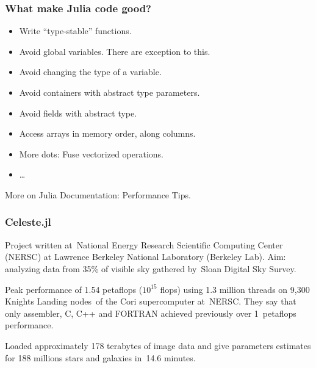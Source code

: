 \documentclass[10pt,t]{beamer}
\begin{document}
\begin{frame}
  \frametitle{What make Julia code good?}


  \begin{itemize}
    \RaggedRight

  \item Write ``\alert{type-stable}'' functions.

  \item Avoid global variables. There are exception to this.

  \item Avoid changing the type of a variable.

  \item Avoid containers with abstract type parameters.

  \item Avoid fields with abstract type.

  \item Access arrays in memory order, along columns.

  \item More dots: Fuse vectorized operations.

  \item \ldots

  \end{itemize}


  More on
  {Julia Documentation: Performance Tips}.

\end{frame}





\begin{frame}
  \frametitle{Celeste.jl}


  Project written at~National Energy Research Scientific Computing
  Center (NERSC) at Lawrence Berkeley National Laboratory (Berkeley
  Lab). Aim: analyzing data from 35\% of visible sky gathered by~Sloan
  Digital Sky Survey.

  Peak performance of 1.54 petaflops ($10^{ 15 }$ flops) using 1.3
  million threads on 9,300 Knights Landing nodes~of the Cori
  supercomputer at~NERSC. They say that only assembler, C, C++ and
  FORTRAN achieved previously over 1~petaflops performance.

  Loaded approximately 178 terabytes of image data and give
  parameters estimates for 188 millions stars and galaxies
  in~14.6 minutes.

\end{frame}
\end{document}
